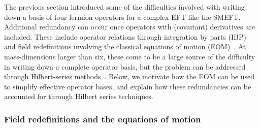 The previous section introduced some of the difficulties involved with writing
down a basis of four-fermion operators for a complex EFT like the SMEFT.
Additional redundancy can occur once operators with (covariant) derivatives are
included. These include operator relations through integration by parts (IBP)
and field redefinitions involving the classical equations of motion
(EOM)~\cite{Buchmuller:1985jz, Arzt:1993gz, Georgi:1991ch}. At mass-dimensions
larger than six, these come to be a large source of the difficulty in writing
down a complete operator basis, but the problem can be addressed through
Hilbert-series methods~\cite{Lehman:2015via, Henning:2015daa, Lehman:2015coa,
  Henning:2015alf, Henning:2017fpj}. Below, we motivate how the EOM can be used
to simplify effective operator bases, and explain how these redundancies can be
accounted for through Hilbert series techniques.

\subsubsection{Field redefinitions and the equations of motion}
\label{sec:eom}

